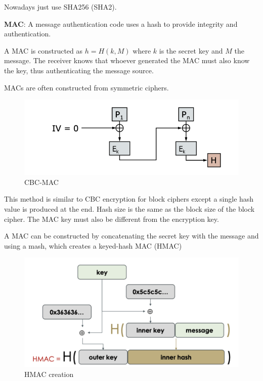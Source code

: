 \documentclass[../notes.tex]{subfiles}
\begin{document}
Nowadays just use SHA256 (SHA2).



\begin{definition}
    \textbf{MAC}: A message authentication code uses a hash to provide integrity and authentication.

    A MAC is constructed as $ h = H(k, M) $ where $ k $ is the secret key and $ M $ the message. The receiver knows that whoever generated the MAC must also know the key, thus authenticating the message source.
\end{definition}


MACs are often constructed from symmetric ciphers.


\begin{figure}[H]
    \centering
    \includegraphics[width=0.8\linewidth]{img/image_2023-02-13-19-10-15.png}
    \caption{CBC-MAC}
\end{figure}

This method is similar to CBC encryption for block ciphers except a single hash value is produced at the end. Hash size is the same as the block size of the block cipher.
The MAC key must also be different from the encryption key.

A MAC can be constructed by concatenating the secret key with the message and using a mash, which creates a keyed-hash MAC (HMAC)

\begin{figure}[H]
    \centering
    \includegraphics[width=0.8\linewidth]{img/image_2023-02-13-19-14-44.png}
    \caption{HMAC creation}
\end{figure}
\end{document}
